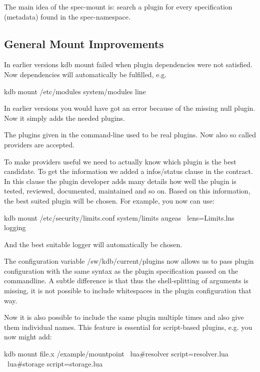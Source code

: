The main idea of the spec-\/mount is\+: search a plugin for every specification (metadata) found in the spec-\/namespace.

\subsection*{General Mount Improvements}

In earlier versions {\ttfamily kdb mount} failed when plugin dependencies were not satisfied. Now dependencies will automatically be fulfilled, e.\+g. \begin{DoxyVerb}    kdb mount /etc/modules system/modules line
\end{DoxyVerb}


In earlier versions you would have got an error because of the missing {\ttfamily null} plugin. Now it simply adds the needed plugins.

The plugins given in the command-\/line used to be real plugins. Now also so called providers are accepted.

To make providers useful we need to actually know which plugin is the best candidate. To get the information we added a {\ttfamily infos/status} clause in the contract. In this clause the plugin developer adds many details how well the plugin is tested, reviewed, documented, maintained and so on. Based on this information, the best suited plugin will be chosen. For example, you now can use\+: \begin{DoxyVerb}    kdb mount /etc/security/limits.conf system/limits augeas \
            lens=Limits.lns logging
\end{DoxyVerb}


And the best suitable logger will automatically be chosen.

The configuration variable {\ttfamily /sw/kdb/current/plugins} now allows us to pass plugin configuration with the same syntax as the plugin specification passed on the commandline. A subtle difference is that thus the shell-\/splitting of arguments is missing, it is not possible to include whitespaces in the plugin configuration that way.

Now it is also possible to include the same plugin multiple times and also give them individual names. This feature is essential for script-\/based plugins, e.\+g. you now might add\+: \begin{DoxyVerb}    kdb mount file.x /example/mountpoint \
            lua#resolver script=resolver.lua \
            lua#storage script=storage.lua
\end{DoxyVerb}


